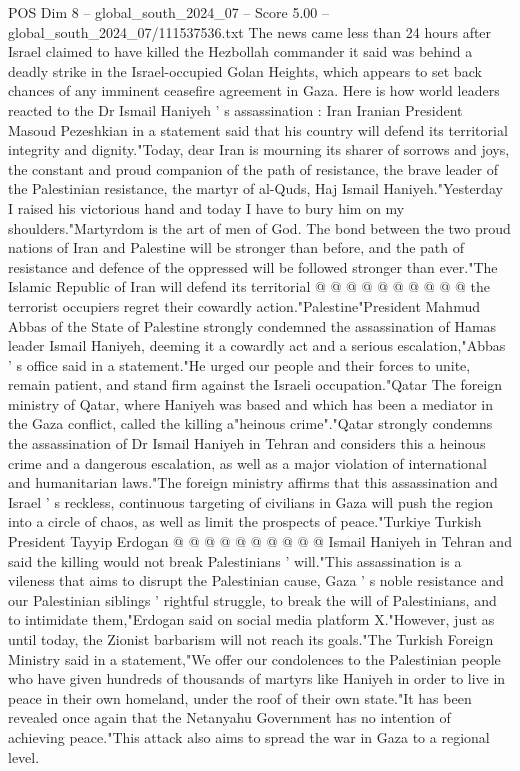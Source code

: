 \begin{textsample}{POS Dim 8 – global\_south\_2024\_07 – Score 5.00 – global\_south\_2024\_07/111537536.txt}  \label{ex:f8_pos_331}
The news came less than 24 hours after Israel claimed to have killed the Hezbollah commander it said was behind a deadly strike in the Israel-occupied Golan Heights, which appears to set back chances of any imminent ceasefire agreement in Gaza.
Here is how world leaders reacted to the Dr Ismail Haniyeh ' s assassination : Iran Iranian President Masoud Pezeshkian in a statement said that his country will defend its territorial integrity and dignity."Today, dear Iran is mourning its sharer of sorrows and joys, the constant and proud companion of the path of resistance, the brave leader of the Palestinian resistance, the martyr of al-Quds, Haj Ismail Haniyeh."Yesterday I raised his victorious hand and today I have to bury him on my shoulders."Martyrdom is the art of men of God.
The bond between the two proud nations of Iran and Palestine will be stronger than before, and the path of resistance and defence of the oppressed will be followed stronger than ever."The Islamic Republic of Iran will defend its territorial @ @ @ @ @ @ @ @ @ @ the terrorist occupiers regret their cowardly action."Palestine"President Mahmud Abbas of the State of Palestine strongly condemned the assassination of Hamas leader Ismail Haniyeh, deeming it a cowardly act and a serious escalation,"Abbas ' s office said in a statement."He urged our people and their forces to unite, remain patient, and stand firm against the Israeli occupation."Qatar The foreign ministry of Qatar, where Haniyeh was based and which has been a mediator in the Gaza conflict, called the killing a"heinous crime"."Qatar strongly condemns the assassination of Dr Ismail Haniyeh in Tehran and considers this a heinous crime and a dangerous escalation, as well as a major violation of international and humanitarian laws."The foreign ministry affirms that this assassination and Israel ' s reckless, continuous targeting of civilians in Gaza will push the region into a circle of chaos, as well as limit the prospects of peace."Turkiye Turkish President Tayyip Erdogan @ @ @ @ @ @ @ @ @ @ Ismail Haniyeh in Tehran and said the killing would not break Palestinians ' will."This assassination is a vileness that aims to disrupt the Palestinian cause, Gaza ' s noble resistance and our Palestinian siblings ' rightful struggle, to break the will of Palestinians, and to intimidate them,"Erdogan said on social media platform X."However, just as until today, the Zionist barbarism will not reach its goals."The Turkish Foreign Ministry said in a statement,"We offer our condolences to the Palestinian people who have given hundreds of thousands of martyrs like Haniyeh in order to live in peace in their own homeland, under the roof of their own state."It has been revealed once again that the Netanyahu Government has no intention of achieving peace."This attack also aims to spread the war in Gaza to a regional level.

\end{textsample}
